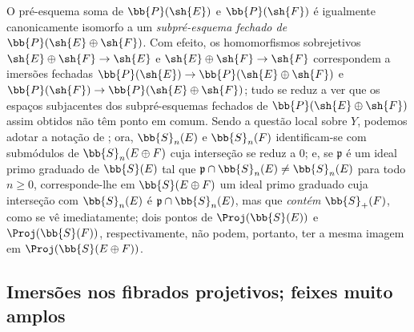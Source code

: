 \documentclass[oneside,10pt]{amsart}
\makeatletter
\renewcommand{\geq}{\geqslant}
\newcommand{\ega@arrow}[2]{\mathchoice{#1}{#2}{#2}{#2}}
\renewcommand{\to}{\ega@arrow{\longrightarrow}{\rightarrow}}
\let\EGAOriginalLabel\label
\renewcommand{\label}[1]{\phantomsection\EGAOriginalLabel{#1}}
\makeatother
\begin{document}
\begin{remark}[4.3.6]
\label{II.4.3.6}
O pré-esquema soma de $\bb{P}(\sh{E})$ e $\bb{P}(\sh{F})$ é igualmente canonicamente isomorfo a um \emph{subpré-esquema fechado de $\bb{P}(\sh{E}\oplus\sh{F})$}.
Com efeito, os homomorfismos sobrejetivos $\sh{E}\oplus\sh{F}\to\sh{E}$ e $\sh{E}\oplus\sh{F}\to\sh{F}$ correspondem a imersões fechadas $\bb{P}(\sh{E})\to\bb{P}(\sh{E}\oplus\sh{F})$ e $\bb{P}(\sh{F})\to\bb{P}(\sh{E}\oplus\sh{F})$;
tudo se reduz a ver que os espaços subjacentes dos subpré-esquemas fechados de $\bb{P}(\sh{E}\oplus\sh{F})$ assim obtidos não têm ponto em comum.
Sendo a questão local sobre $Y$, podemos adotar a notação de ;
ora, $\bb{S}_n(E)$ e $\bb{S}_n(F)$ identificam-se com submódulos de $\bb{S}_n(E\oplus F)$ cuja interseção se reduz a $0$;
e, se $\mathfrak{p}$ é um ideal primo graduado de $\bb{S}(E)$ tal que $\mathfrak{p}\cap\bb{S}_n(E)\neq\bb{S}_n(E)$ para todo $n\geq0$, corresponde-lhe em $\bb{S}(E\oplus F)$ um ideal primo graduado cuja interseção com $\bb{S}_n(E)$ é $\mathfrak{p}\cap\bb{S}_n(E)$, mas que \emph{contém} $\bb{S}_+(F)$, como se vê imediatamente;
dois pontos de $\Proj(\bb{S}(E))$ e $\Proj(\bb{S}(F))$, respectivamente, não podem, portanto, ter a mesma imagem em $\Proj(\bb{S}(E\oplus F))$.
\end{remark}

\subsection{Imersões nos fibrados projetivos; feixes muito amplos}
\label{subsection:II.4.4}
\end{document}
